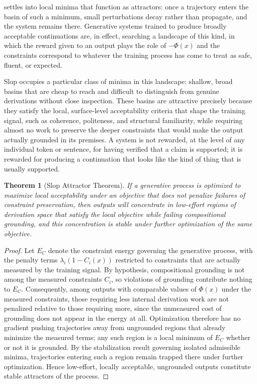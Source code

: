 \documentclass[11pt,oneside]{book}
\theoremstyle{plain}
\newtheorem{theorem}{Theorem}[chapter]
\theoremstyle{definition}
\theoremstyle{remark}
\begin{document}
settles into local minima that function as attractors: once a trajectory enters the basin of such a minimum, small perturbations decay rather than propagate, and the system remains there. Generative systems trained to produce broadly acceptable continuations are, in effect, searching a landscape of this kind, in which the reward given to an output plays the role of \(-\Phi(x)\) and the constraints correspond to whatever the training process has come to treat as safe, fluent, or expected.

Slop occupies a particular class of minima in this landscape: shallow, broad basins that are cheap to reach and difficult to distinguish from genuine derivations without close inspection. These basins are attractive precisely because they satisfy the local, surface-level acceptability criteria that shape the training signal, such as coherence, politeness, and structural familiarity, while requiring almost no work to preserve the deeper constraints that would make the output actually grounded in its premises. A system is not rewarded, at the level of any individual token or sentence, for having verified that a claim is supported; it is rewarded for producing a continuation that looks like the kind of thing that is usually supported.

\begin{theorem}[Slop Attractor Theorem]
If a generative process is optimized to maximize local acceptability under an objective that does not penalize failures of constraint preservation, then outputs will concentrate in low-effort regions of derivation space that satisfy the local objective while failing compositional grounding, and this concentration is stable under further optimization of the same objective.
\end{theorem}

\begin{proof}
Let \(E_C\) denote the constraint energy governing the generative process, with the penalty terms \(\lambda_i(1-C_i(x))\) restricted to constraints that are actually measured by the training signal. By hypothesis, compositional grounding is not among the measured constraints \(C_i\), so violations of grounding contribute nothing to \(E_C\). Consequently, among outputs with comparable values of \(\Phi(x)\) under the measured constraints, those requiring less internal derivation work are not penalized relative to those requiring more, since the unmeasured cost of grounding does not appear in the energy at all. Optimization therefore has no gradient pushing trajectories away from ungrounded regions that already minimize the measured terms; any such region is a local minimum of \(E_C\) whether or not it is grounded. By the stabilization result governing isolated admissible minima, trajectories entering such a region remain trapped there under further optimization. Hence low-effort, locally acceptable, ungrounded outputs constitute stable attractors of the process.
\end{proof}
\end{document}
